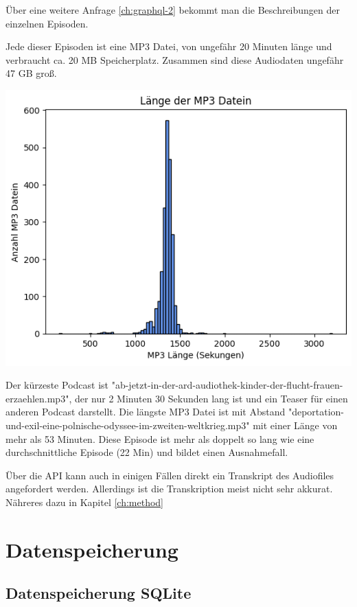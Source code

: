 Über eine weitere Anfrage \autoref{ch:graphql-2} bekommt man die Beschreibungen der einzelnen Episoden. 

Jede dieser Episoden ist eine MP3 Datei, von ungefähr 20 Minuten länge und verbraucht ca. 20 MB Speicherplatz.
Zusammen sind diese Audiodaten ungefähr 47 GB groß. 

\includegraphics[width=\linewidth]{figures/mp3_length.png}

Der kürzeste Podcast ist "ab-jetzt-in-der-ard-audiothek-kinder-der-flucht-frauen-erzaehlen.mp3", der nur 2 Minuten 30 Sekunden lang ist und ein Teaser für einen anderen Podcast darstellt.
Die längste MP3 Datei ist mit Abstand "deportation-und-exil-eine-polnische-odyssee-im-zweiten-weltkrieg.mp3" mit einer Länge von mehr als 53 Minuten.
Diese Episode ist mehr als doppelt so lang wie eine durchschnittliche Episode (22 Min) und bildet einen Ausnahmefall.


Über die API kann auch in einigen Fällen direkt ein Transkript des Audiofiles angefordert werden. 
Allerdings ist die Transkription meist nicht sehr akkurat.
Nähreres dazu in Kapitel \autoref{ch:method}

\section{Datenspeicherung}

\subsection{Datenspeicherung SQLite}

